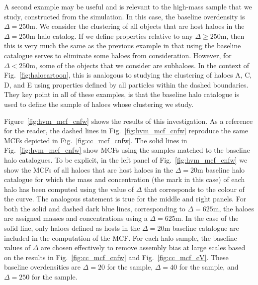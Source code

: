 \documentclass[usenatbib,fleqn]{mnras}
\begin{document}
A second example may be useful and is relevant to the high-mass sample that we study, constructed from the \simC{} simulation. In this case, the baseline overdensity is $\Delta=250$m. We consider the clustering of all objects that are host haloes in the $\Delta=250$m halo catalog. If we define properties relative to any $\Delta \ge 250$m, then this is very much the same as the previous example in that using the baseline catalogue serves to eliminate some haloes from consideration. However, for $\Delta < 250$m, some of the objects that we consider are subhaloes. In the context of Fig.~\ref{fig:halocartoon}, this is analogous to studying the clustering of haloes A, C, D, and E using properties defined by all particles within the dashed boundaries. They key point in all of these examples, is that the baseline halo catalogue is used to define the sample of haloes whose clustering we study.

Figure~\ref{fig:hvm_mcf_cnfw} shows the results of this investigation. As a reference for the reader, the dashed lines in Fig.~\ref{fig:hvm_mcf_cnfw} reproduce the same MCFs depicted in Fig.~\ref{fig:cc_mcf_cnfw}. The solid lines in Fig.~\ref{fig:hvm_mcf_cnfw} show MCFs using the samples matched to the baseline halo catalogues. To be explicit, in the left panel of Fig.~\ref{fig:hvm_mcf_cnfw} we show the MCFs of all haloes that are host haloes in the  $\Delta=20$m baseline halo catalogue for which the mass and concentration (the mark in this case) of each halo has been computed using the value of $\Delta$ that corresponds to the colour of the curve. The analogous statement is true for the middle and right panels. For both the solid and dashed dark blue lines, corresponding to $\Delta=625$m, the haloes are assigned masses and concentrations using a $\Delta=625$m. In the case of the solid line, only haloes defined as hosts in the $\Delta=20$m baseline catalogue are included in the computation of the MCF. For each halo sample, the baseline values of $\Delta$ are chosen effectively to remove assembly bias at large scales based on the results in Fig.~\ref{fig:cc_mcf_cnfw} and Fig.~\ref{fig:cc_mcf_cV}. These baseline overdensities are $\Delta=20$ for the \simA{} sample, $\Delta=40$ for the \simB{} sample, and $\Delta=250$ for the \simC{} sample. 
\end{document}
